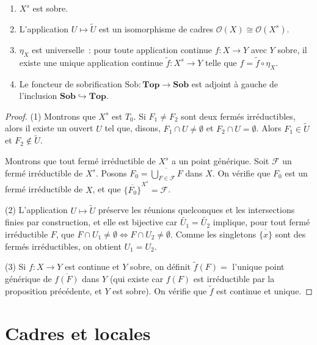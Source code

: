 \begin{theoreme}
\begin{enumerate}
  \item $X^s$ est sobre.
  \item L'application $U \mapsto \tilde{U}$ est un isomorphisme de cadres
    $\mathcal{O}(X) \cong \mathcal{O}(X^s)$.
  \item $\eta_X$ est universelle~: pour toute application continue $f\colon X \to Y$ avec
    $Y$ sobre, il existe une unique application continue $\tilde{f}\colon X^s \to Y$ telle
    que $f = \tilde{f} \circ \eta_X$.
  \item Le foncteur de sobrification $\mathrm{Sob}\colon \mathbf{Top} \to \mathbf{Sob}$
    est adjoint \`a gauche de l'inclusion $\mathbf{Sob} \hookrightarrow \mathbf{Top}$.
\end{enumerate}
\end{theoreme}

\begin{proof}
(1) Montrons que $X^s$ est $T_0$. Si $F_1 \neq F_2$ sont deux ferm\'es irr\'eductibles,
alors il existe un ouvert $U$ tel que, disons, $F_1 \cap U \neq \emptyset$ et
$F_2 \cap U = \emptyset$. Alors $F_1 \in \tilde{U}$ et $F_2 \notin \tilde{U}$.

Montrons que tout ferm\'e irr\'eductible de $X^s$ a un point g\'en\'erique. Soit
$\mathcal{F}$ un ferm\'e irr\'eductible de $X^s$. Posons
$F_0 = \overline{\bigcup_{F \in \mathcal{F}} F}$ dans $X$. On v\'erifie que $F_0$ est
un ferm\'e irr\'eductible de $X$, et que $\overline{\{F_0\}}^{X^s} = \mathcal{F}$.

(2) L'application $U \mapsto \tilde{U}$ pr\'eserve les r\'eunions quelconques et les
intersections finies par construction, et elle est bijective car $\tilde{U_1} = \tilde{U_2}$
implique, pour tout ferm\'e irr\'eductible $F$, que $F \cap U_1 \neq \emptyset \Leftrightarrow
F \cap U_2 \neq \emptyset$. Comme les singletons $\overline{\{x\}}$ sont des ferm\'es
irr\'eductibles, on obtient $U_1 = U_2$.

(3) Si $f\colon X \to Y$ est continue et $Y$ sobre, on d\'efinit
$\tilde{f}(F) = $ l'unique point g\'en\'erique de $\overline{f(F)}$ dans $Y$ (qui existe
car $f(F)$ est irr\'eductible par la proposition pr\'ec\'edente, et $Y$ est sobre). On
v\'erifie que $\tilde{f}$ est continue et unique.
\end{proof}

\section{Cadres et locales}

